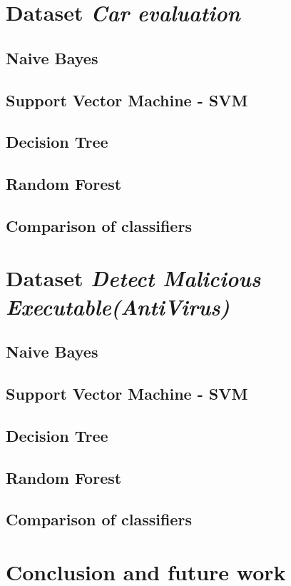 \documentclass[11pt,a4paper,titlepage]{article}
\begin{document}
\section{Dataset \textit{Car evaluation}}
\subsection{Naive Bayes}
\subsection{Support Vector Machine - SVM}
\subsection{Decision Tree}
\subsection{Random Forest}
\subsection{Comparison of classifiers}

\section{Dataset \textit{Detect Malicious Executable(AntiVirus)}}
\subsection{Naive Bayes}
\subsection{Support Vector Machine - SVM}
\subsection{Decision Tree}
\subsection{Random Forest}
\subsection{Comparison of classifiers}

\section{Conclusion and future work}
\end{document}
